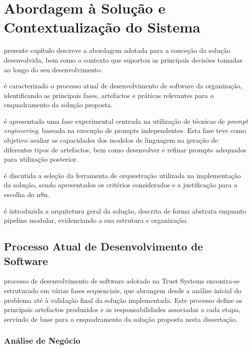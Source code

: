 \chapter{Abordagem à Solução e Contextualização do Sistema}
\label{chap:visao-geral}

 presente capítulo descreve a abordagem adotada para a conceção da solução desenvolvida, bem como o contexto que suportou as principais decisões tomadas ao longo do seu desenvolvimento.

 é caracterizado o processo atual de desenvolvimento de software da organização, identificando as principais fases, artefactos e práticas relevantes para o enquadramento da solução proposta.

 é apresentada uma fase experimental centrada na utilização de técnicas de \textit{prompt engineering}, baseada na execução de prompts independentes. Esta fase teve como objetivo avaliar as capacidades dos modelos de linguagem na geração de diferentes tipos de artefactos, bem como desenvolver e refinar prompts adequados para utilização posterior.

 é discutida a seleção da ferramenta de orquestração utilizada na implementação da solução, sendo apresentados os critérios considerados e a justificação para a escolha do n8n.

 é introduzida a arquitetura geral da solução, descrita de forma abstrata enquanto pipeline modular, evidenciando a sua estrutura e organização.



\section{Processo Atual de Desenvolvimento de Software}

 processo de desenvolvimento de software adotado na Trust Systems encontra-se estruturado em várias fases sequenciais, que abrangem desde a análise inicial do problema até à validação final da solução implementada. Este processo define os principais artefactos produzidos e as responsabilidades associadas a cada etapa, servindo de base para o enquadramento da solução proposta nesta dissertação.

\subsection{Análise de Negócio}

